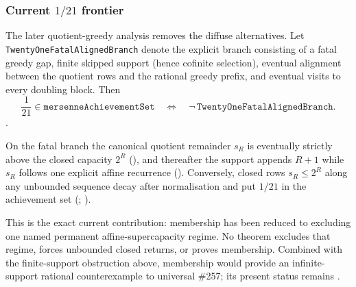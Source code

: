 \subsubsection{Current $1/21$ frontier}

The later quotient-greedy analysis removes the diffuse alternatives.  Let
\texttt{TwentyOneFatalAlignedBranch} denote the explicit branch consisting
of a fatal greedy gap, finite skipped support (hence cofinite selection),
eventual alignment between the quotient rows and the rational greedy prefix,
and eventual visits to every doubling block.  Then
\[
 \frac1{21}\in\mathtt{mersenneAchievementSet}
 \quad\Longleftrightarrow\quad
 \neg\,\mathtt{TwentyOneFatalAlignedBranch}.
\]
\quad{}\quad{}\quad{}.

On the fatal branch the canonical quotient remainder $s_R$ is eventually
strictly above the closed capacity $2^R$
(),
and thereafter the support appends $R+1$ while $s_R$ follows one explicit
affine recurrence
().
Conversely, closed rows $s_R\le2^R$ along any unbounded sequence decay after
normalisation and put $1/21$ in the achievement set
(;
).

This is the exact current contribution: membership has been reduced to
excluding one named permanent affine-supercapacity regime.  No theorem
excludes that regime, forces unbounded closed returns, or proves membership.
Combined with the finite-support obstruction above, membership would provide
an infinite-support rational counterexample to universal \#257; its present
status remains .
